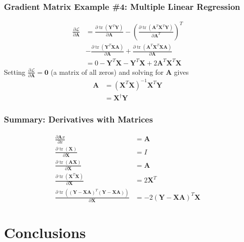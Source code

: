 \documentclass{beamer}
\DeclareMathOperator{\tr}{tr}
\begin{document}
\begin{frame}
  \frametitle{Gradient Matrix Example \#4: Multiple Linear Regression}

  \begin{align*}
    \frac{\partial\mathcal{L}}{\partial\mathbf{A}}
    &=
    \frac{\partial\tr(\mathbf{Y}^T\mathbf{Y})}{\partial\mathbf{A}}-
    \left(\frac{\partial\tr(\mathbf{A}^T\mathbf{X}^T\mathbf{Y})}{\partial\mathbf{A}^T}\right)^T\\
    &-
    \frac{\partial\tr(\mathbf{Y}^T\mathbf{X}\mathbf{A})}{\partial\mathbf{A}}+
    \frac{\partial\tr(\mathbf{A}^T\mathbf{X}^T\mathbf{X}\mathbf{A})}{\partial\mathbf{A}}\\
    &=0-\mathbf{Y}^T\mathbf{X}-\mathbf{Y}^T\mathbf{X}
    +2\mathbf{A}^T\mathbf{X}^T\mathbf{X}
  \end{align*}
  Setting $\frac{\partial\mathcal{L}}{\partial\mathbf{A}}=\mathbf{0}$ (a matrix of all zeros) and
  solving for $\mathbf{A}$ gives
  \begin{align*}
    \mathbf{A}&=\left(\mathbf{X}^T\mathbf{X}\right)^{-1}\mathbf{X}^T\mathbf{Y}\\
    &=\mathbf{X}^\dag\mathbf{Y}
  \end{align*}
\end{frame}


\begin{frame}
  \frametitle{Summary: Derivatives with Matrices}
  \begin{align*}
    \frac{\partial \mathbf{A}x}{\partial x} &= \mathbf{A}\\
    \frac{\partial\tr(\mathbf{X})}{\partial\mathbf{X}} &= I\\
    \frac{\partial\tr(\mathbf{A}\mathbf{X})}{\partial\mathbf{X}} &= \mathbf{A}\\
    \frac{\partial\tr(\mathbf{X}^T\mathbf{X})}{\partial\mathbf{X}} &=2\mathbf{X}^T\\
    \frac{\partial\tr((\mathbf{Y}-\mathbf{X}\mathbf{A})^T(\mathbf{Y}-\mathbf{X}\mathbf{A}))}{\partial\mathbf{X}}
    &=
    -2\left(\mathbf{Y}-\mathbf{X}\mathbf{A}\right)^T\mathbf{X}
  \end{align*}    
\end{frame}


\section{Conclusions}
\setcounter{subsection}{1}
\end{document}
